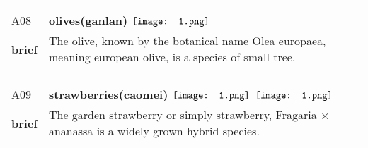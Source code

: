 \documentclass[UTF8]{article}
\begin{document}
            \begin{tabularx}{\textwidth}{p{1.5cm}X}
            \arrayrulecolor{myBlue}
        	\hline\\
            \small{A08}&
            \large{\bfseries{olives(ganlan)}}\hfill
                                                            $\vcenter{\hbox{\texttt{[image: 1.png]}}}$
                                                                \phantom{$\vcenter{\hbox{\texttt{[image: 1.png]}}}$}
                                                                \phantom{$\vcenter{\hbox{\texttt{[image: 1.png]}}}$}
                                                                \phantom{$\vcenter{\hbox{\texttt{[image: 1.png]}}}$}
                                                                \phantom{$\vcenter{\hbox{\texttt{[image: 1.png]}}}$}
                                                                \phantom{$\vcenter{\hbox{\texttt{[image: 1.png]}}}$}
                                                                \phantom{$\vcenter{\hbox{\texttt{[image: 1.png]}}}$}
                                        \\[10pt]
            \large{\bfseries{brief}}&\noindent\parbox[c]{\hsize}{The olive, known by the botanical name Olea europaea, meaning european olive, is a species of small tree.} \\[5pt]
            \hline\\[-10pt]
        \end{tabularx}
            \begin{tabularx}{\textwidth}{p{1.5cm}X}
            \arrayrulecolor{myBlue}
        	\hline\\
            \small{A09}&
            \large{\bfseries{strawberries(caomei)}}\hfill
                                                            $\vcenter{\hbox{\texttt{[image: 1.png]}}}$
                                                                \phantom{$\vcenter{\hbox{\texttt{[image: 1.png]}}}$}
                                                                \phantom{$\vcenter{\hbox{\texttt{[image: 1.png]}}}$}
                                                                \phantom{$\vcenter{\hbox{\texttt{[image: 1.png]}}}$}
                                                                $\vcenter{\hbox{\texttt{[image: 1.png]}}}$
                                                                \phantom{$\vcenter{\hbox{\texttt{[image: 1.png]}}}$}
                                                                \phantom{$\vcenter{\hbox{\texttt{[image: 1.png]}}}$}
                                        \\[10pt]
            \large{\bfseries{brief}}&\noindent\parbox[c]{\hsize}{The garden strawberry or simply strawberry, Fragaria × ananassa is a widely grown hybrid species.} \\[5pt]
            \hline\\[-10pt]
        \end{tabularx}
\end{document}

